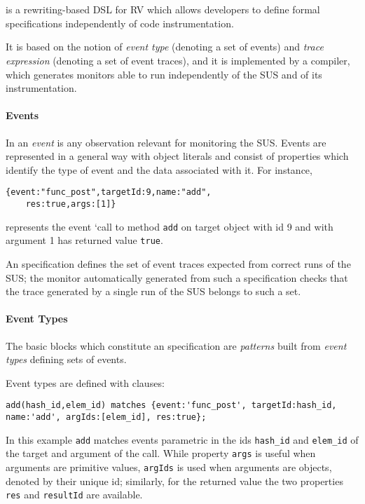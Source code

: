 \section{\rml}
\label{sec:rml}
\rml\cite{RML2021} is a rewriting-based DSL for RV which allows developers to define formal specifications independently of code instrumentation.

It  is based on the notion of \emph{event type} (denoting a set of events) and \emph{trace expression} (denoting a set of event traces),
and it is implemented by a compiler, which generates monitors able to run independently of the SUS and of its instrumentation. 

\paragraph{Events}
In \rml an \emph{event} is any observation relevant for monitoring the SUS.
Events are represented in a general way with object literals and
consist of properties which identify the type of event and the data associated with it. For instance,

\begin{lstlisting}
{event:"func_post",targetId:9,name:"add",
    res:true,args:[1]}
\end{lstlisting}          
represents the event
`call to method \lstinline{add} on target object with id 9 and with argument 1  has returned value \lstinline{true}.

An \rml specification defines the set of event traces expected from correct runs of the SUS; the monitor automatically generated from
such a specification checks that the trace generated by a single run of the SUS belongs to such a set.

\paragraph{Event Types}
The basic blocks which constitute an \rml specification are \emph{patterns} built from
\emph{event types} defining sets of events.

Event types are defined with clauses:
\begin{lstlisting}[basicstyle=\ttfamily\scriptsize]
add(hash_id,elem_id) matches {event:'func_post', targetId:hash_id, name:'add', argIds:[elem_id], res:true};
\end{lstlisting}
In this example \lstinline{add} matches events parametric in the
ids \lstinline{hash_id} and \lstinline{elem_id} of the target and argument of the call. While property
\lstinline{args} is useful when arguments are primitive values, \lstinline{argIds} is used when arguments are objects, denoted by their unique id;
similarly, for the returned value the two properties \lstinline{res} and \lstinline{resultId} are available.

